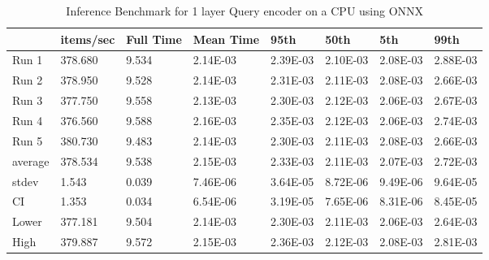 \begin{table*}[!ht]
    \centering
    \begin{tabular}{|l|l|l|l|l|l|l|l|}
    \hline
        ~ & items/sec & Full Time & Mean Time & 95th & 50th & 5th & 99th \\ \hline
        Run 1 & 378.680 & 9.534 & 2.14E-03 & 2.39E-03 & 2.10E-03 & 2.08E-03 & 2.88E-03 \\ \hline
        Run 2 & 378.950 & 9.528 & 2.14E-03 & 2.31E-03 & 2.11E-03 & 2.08E-03 & 2.66E-03 \\ \hline
        Run 3 & 377.750 & 9.558 & 2.13E-03 & 2.30E-03 & 2.12E-03 & 2.06E-03 & 2.67E-03 \\ \hline
        Run 4 & 376.560 & 9.588 & 2.16E-03 & 2.35E-03 & 2.12E-03 & 2.06E-03 & 2.74E-03 \\ \hline
        Run 5 & 380.730 & 9.483 & 2.14E-03 & 2.30E-03 & 2.11E-03 & 2.08E-03 & 2.66E-03 \\ \hline
        average & 378.534 & 9.538 & 2.15E-03 & 2.33E-03 & 2.11E-03 & 2.07E-03 & 2.72E-03 \\ \hline
        stdev & 1.543 & 0.039 & 7.46E-06 & 3.64E-05 & 8.72E-06 & 9.49E-06 & 9.64E-05 \\ \hline
        CI & 1.353 & 0.034 & 6.54E-06 & 3.19E-05 & 7.65E-06 & 8.31E-06 & 8.45E-05 \\ \hline
        Lower & 377.181 & 9.504 & 2.14E-03 & 2.30E-03 & 2.11E-03 & 2.06E-03 & 2.64E-03 \\ \hline
        High & 379.887 & 9.572 & 2.15E-03 & 2.36E-03 & 2.12E-03 & 2.08E-03 & 2.81E-03 \\ \hline
    \end{tabular}
    \caption{Inference Benchmark for 1 layer Query encoder on a CPU using ONNX}
    \label{tab:benchmark-cpu-1layer}
\end{table*}

